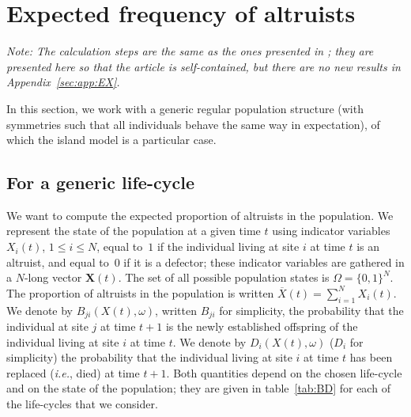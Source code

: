 \documentclass[11pt, letterpaper]{article}
\newcommand{\ie}{\textit{i.e.}}
\newcommand{\appname}[0]{Appendix}
\begin{document}
\clearpage

\section{Expected frequency of altruists\label{sec:app:EX}}

\textit{Note: The calculation steps are the same as the ones presented in \citet{Debarre2017}; they are presented here so that the article is self-contained, but there are no new results in \appname~\ref{sec:app:EX}. }

In this section, we work with a generic regular population structure (with symmetries such that all individuals behave the same way in expectation), of which the island model is a particular case. 

\subsection{For a generic life-cycle \label{sec:app:generic}}

We want to compute the expected proportion of altruists in the population. We represent the state of the population at a given time $t$ using indicator variables $X_i(t)$, $1\leq i \leq N$, equal to~$1$ if the individual living at site $i$ at time $t$ is an altruist, and equal to~$0$ if it is a defector; these indicator variables are gathered in a $N$-long vector $\mathbf{X}(t)$. The set of all possible population states is $\Omega = \{0,1\}^N$. The proportion of altruists in the population is written $\overline{X}(t) = \sum_{i=1}^N X_i(t)$. We denote by $B_{ji}(X(t), \omega)$, written $B_{ji}$ for simplicity, the probability that the individual at site $j$ at time $t+1$ is the newly established offspring of the individual living at site $i$ at time $t$. We denote by $D_{i}(X(t), \omega)$ ($D_i$ for simplicity) the probability that the individual living at site $i$ at time $t$ has been replaced (\ie, died) at time $t+1$. Both quantities depend on the chosen life-cycle and on the state of the population; they are given in table~\ref{tab:BD} for each of the life-cycles that we consider. 
\end{document}
